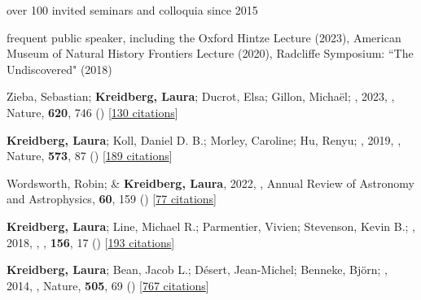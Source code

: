\documentclass[12pt,letterpaper]{article}
\begin{document}
\begin{list}{}{\cvlist}
\item over 100 invited seminars and colloquia since 2015 
\item frequent public speaker, including the
    Oxford Hintze Lecture (2023), American Museum of Natural History Frontiers Lecture (2020), Radcliffe Symposium: ``The Undiscovered" (2018)
\end{list}






\begin{list}{}{\cvlist}
\item[{\color{numcolor}\scriptsize23}] Zieba, Sebastian; \textbf{Kreidberg, Laura}; Ducrot, Elsa; Gillon, Micha{\"e}l; \etal, 2023, , Nature, \textbf{620}, 746 () [\href{https://ui.adsabs.harvard.edu/abs/2023Natur.620..746Z}{130 citations}]

\item[{\color{numcolor}\scriptsize2}] \textbf{Kreidberg, Laura}; Koll, Daniel D. B.; Morley, Caroline; Hu, Renyu; \etal, 2019, , Nature, \textbf{573}, 87 () [\href{https://ui.adsabs.harvard.edu/abs/2019Natur.573...87K}{189 citations}]

\item[{\color{numcolor}\scriptsize3}] Wordsworth, Robin; \& \textbf{Kreidberg, Laura}, 2022, , Annual Review of Astronomy and Astrophysics, \textbf{60}, 159 () [\href{https://ui.adsabs.harvard.edu/abs/2022ARA&A..60..159W}{77 citations}]

\item[{\color{numcolor}\scriptsize4}] \textbf{Kreidberg, Laura}; Line, Michael R.; Parmentier, Vivien; Stevenson, Kevin B.; \etal, 2018, , \aj, \textbf{156}, 17 () [\href{https://ui.adsabs.harvard.edu/abs/2018AJ....156...17K}{193 citations}]


\item[{\color{numcolor}\scriptsize5}] \textbf{Kreidberg, Laura}; Bean, Jacob L.; D{\'e}sert, Jean-Michel; Benneke, Bj{\"o}rn; \etal, 2014, , Nature, \textbf{505}, 69 () [\href{https://ui.adsabs.harvard.edu/abs/2014Natur.505...69K}{767 citations}]

\end{list}
\end{document}
